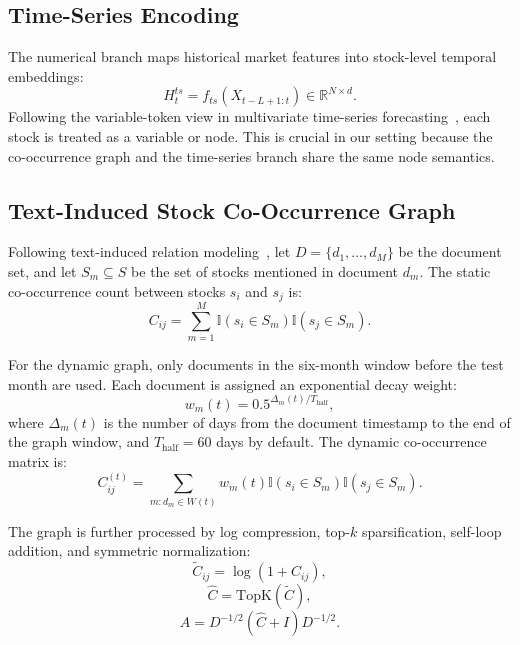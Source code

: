 \documentclass[runningheads]{llncs}
\begin{document}
\subsection{Time-Series Encoding}

The numerical branch maps historical market features into stock-level temporal embeddings:
\begin{equation}
H_t^{ts} = f_{ts}(X_{t-L+1:t}) \in \mathbb{R}^{N \times d}.
\end{equation}
Following the variable-token view in multivariate time-series forecasting~\cite{liu2023itransformer,liu2025timecma}, each stock is treated as a variable or node. This is crucial in our setting because the co-occurrence graph and the time-series branch share the same node semantics.

\subsection{Text-Induced Stock Co-Occurrence Graph}

Following text-induced relation modeling~\cite{li2025cograsp}, let $D = \{d_1, \dots, d_M\}$ be the document set, and let $S_m \subseteq S$ be the set of stocks mentioned in document $d_m$. The static co-occurrence count between stocks $s_i$ and $s_j$ is:
\begin{equation}
C_{ij} = \sum_{m=1}^{M} \mathbb{I}(s_i \in S_m)\mathbb{I}(s_j \in S_m).
\end{equation}

For the dynamic graph, only documents in the six-month window before the test month are used. Each document is assigned an exponential decay weight:
\begin{equation}
w_m(t) = 0.5^{\Delta_m(t)/T_{\text{half}}},
\end{equation}
where $\Delta_m(t)$ is the number of days from the document timestamp to the end of the graph window, and $T_{\text{half}} = 60$ days by default. The dynamic co-occurrence matrix is:
\begin{equation}
C^{(t)}_{ij} = \sum_{m : d_m \in W(t)} w_m(t)\mathbb{I}(s_i \in S_m)\mathbb{I}(s_j \in S_m).
\end{equation}

The graph is further processed by log compression, top-$k$ sparsification, self-loop addition, and symmetric normalization:
\begin{equation}
\tilde{C}_{ij} = \log(1 + C_{ij}),
\end{equation}
\begin{equation}
\hat{C} = \text{TopK}(\tilde{C}),
\end{equation}
\begin{equation}
A = D^{-1/2}(\hat{C}+I)D^{-1/2}.
\end{equation}
\end{document}
